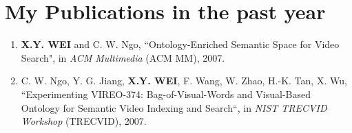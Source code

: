 \chapter{My Publications in the past year}
\begin{enumerate}
    \item \textbf{X.Y. WEI} and C. W. Ngo, ``Ontology-Enriched Semantic Space for Video Search", in \emph{ACM Multimedia} (ACM MM),
    2007.
    \item C. W. Ngo, Y. G. Jiang, \textbf{X.Y. WEI}, F. Wang, W. Zhao, H.-K. Tan, X. Wu, ``Experimenting VIREO-374: Bag-of-Visual-Words and Visual-Based Ontology for Semantic Video Indexing and Search``, in \emph{NIST TRECVID Workshop} (TRECVID),
    2007.
\end{enumerate}
